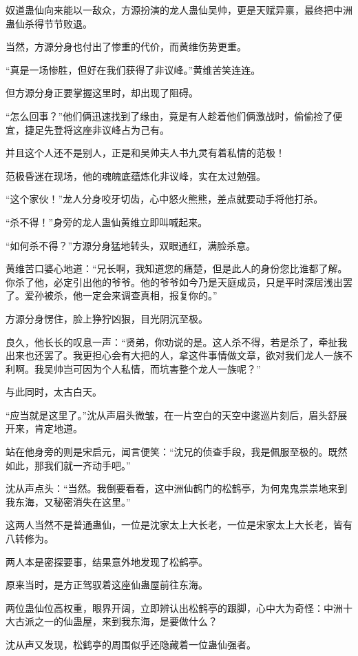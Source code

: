 \begin{this_body}
奴道蛊仙向来能以一敌众，方源扮演的龙人蛊仙吴帅，更是天赋异禀，最终把中洲蛊仙杀得节节败退。

当然，方源分身也付出了惨重的代价，而黄维伤势更重。

“真是一场惨胜，但好在我们获得了非议峰。”黄维苦笑连连。

但方源分身正要掌握这里时，却出现了阻碍。

“怎么回事？”他们俩迅速找到了缘由，竟是有人趁着他们俩激战时，偷偷捡了便宜，捷足先登将这座非议峰占为己有。

并且这个人还不是别人，正是和吴帅夫人书九灵有着私情的范极！

范极昏迷在现场，他的魂魄底蕴炼化非议峰，实在太过勉强。

“这个家伙！”龙人分身咬牙切齿，心中怒火熊熊，差点就要动手将他打杀。

“杀不得！”身旁的龙人蛊仙黄维立即叫喊起来。

“如何杀不得？”方源分身猛地转头，双眼通红，满脸杀意。

黄维苦口婆心地道：“兄长啊，我知道您的痛楚，但是此人的身份您比谁都了解。你杀了他，必定引出他的爷爷。他的爷爷如今乃是天庭成员，只是平时深居浅出罢了。爱孙被杀，他一定会来调查真相，报复你的。”

方源分身愣住，脸上狰狞凶狠，目光阴沉至极。

良久，他长长的叹息一声：“贤弟，你劝说的是。这人杀不得，若是杀了，牵扯我出来也还罢了。我更担心会有大把的人，拿这件事情做文章，欲对我们龙人一族不利啊。我吴帅岂可因为个人私情，而坑害整个龙人一族呢？”

与此同时，太古白天。

“应当就是这里了。”沈从声眉头微皱，在一片空白的天空中逡巡片刻后，眉头舒展开来，肯定地道。

站在他身旁的则是宋启元，闻言便笑：“沈兄的侦查手段，我是佩服至极的。既然如此，那我们就一齐动手吧。”

沈从声点头：“当然。我倒要看看，这中洲仙鹤门的松鹤亭，为何鬼鬼祟祟地来到我东海，又秘密消失在这里。”

这两人当然不是普通蛊仙，一位是沈家太上大长老，一位是宋家太上大长老，皆有八转修为。

两人本是密探要事，结果意外地发现了松鹤亭。

原来当时，是方正驾驭着这座仙蛊屋前往东海。

两位蛊仙位高权重，眼界开阔，立即辨认出松鹤亭的跟脚，心中大为奇怪：中洲十大古派之一的仙蛊屋，来到我东海，是要做什么？

沈从声又发现，松鹤亭的周围似乎还隐藏着一位蛊仙强者。


\end{this_body}
